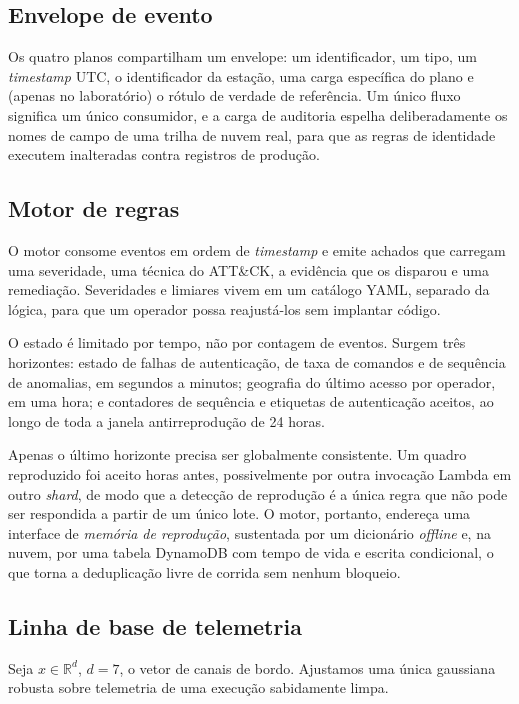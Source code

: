 \documentclass[conference]{IEEEtran}
\begin{document}
\subsection{Envelope de evento}

Os quatro planos compartilham um envelope: um identificador, um tipo, um
\emph{timestamp} UTC, o identificador da estação, uma carga específica do plano
e (apenas no laboratório) o rótulo de verdade de referência. Um único fluxo
significa um único consumidor, e a carga de auditoria espelha deliberadamente os
nomes de campo de uma trilha de nuvem real, para que as regras de identidade
executem inalteradas contra registros de produção.

\subsection{Motor de regras}

O motor consome eventos em ordem de \emph{timestamp} e emite achados que
carregam uma severidade, uma técnica do ATT\&CK, a evidência que os disparou e
uma remediação. Severidades e limiares vivem em um catálogo YAML, separado da
lógica, para que um operador possa reajustá-los sem implantar código.

O estado é limitado por tempo, não por contagem de eventos. Surgem três
horizontes: estado de falhas de autenticação, de taxa de comandos e de sequência
de anomalias, em segundos a minutos; geografia do último acesso por operador, em
uma hora; e contadores de sequência e etiquetas de autenticação aceitos, ao
longo de toda a janela antirreprodução de 24 horas.

Apenas o último horizonte precisa ser globalmente consistente. Um quadro
reproduzido foi aceito horas antes, possivelmente por outra invocação Lambda em
outro \emph{shard}, de modo que a detecção de reprodução é a única regra que não
pode ser respondida a partir de um único lote. O motor, portanto, endereça uma
interface de \emph{memória de reprodução}, sustentada por um dicionário
\emph{offline} e, na nuvem, por uma tabela DynamoDB com tempo de vida e escrita
condicional, o que torna a deduplicação livre de corrida sem nenhum bloqueio.

\subsection{Linha de base de telemetria}
\label{sec:model}

Seja $x \in \mathbb{R}^{d}$, $d = 7$, o vetor de canais de bordo. Ajustamos uma
única gaussiana robusta sobre telemetria de uma execução sabidamente limpa.
\end{document}
